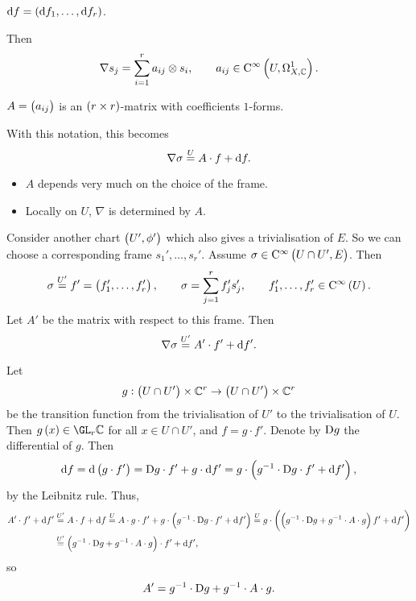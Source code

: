 \begin{notation*}
$ \d f = \br{\d f_1, \dots, \d f_r} $.
\end{notation*}

Then
$$ \nabla s_j = \sum_{i = 1}^r a_{ij} \otimes s_i, \qquad a_{ij} \in \C^\infty\br{U, \Omega_{X, \CC}^1}. $$

\begin{notation*}
$ A = \br{a_{ij}} $ is an $ \br{r \times r} $-matrix with coefficients $ 1 $-forms.
\end{notation*}

With this notation, this becomes
$$ \nabla\sigma \overset{U}{=} A \cdot f + \mathrm{d} f. $$
\begin{itemize}
\item $ A $ depends very much on the choice of the frame.
\item Locally on $ U $, $ \nabla $ is determined by $ A $.
\end{itemize}
Consider another chart $ \br{U', \phi'} $ which also gives a trivialisation of $ E $. So we can choose a corresponding frame $ s_1', \dots, s_r' $. Assume $ \sigma \in \C^\infty\br{U \cap U', E} $. Then
$$ \sigma \overset{U'}{=} f' = \br{f_1', \dots, f_r'}, \qquad \sigma = \sum_{j = 1}^r f_j's_j', \qquad f_1', \dots, f_r' \in \C^\infty\br{U}. $$
Let $ A' $ be the matrix with respect to this frame. Then
$$ \nabla\sigma \overset{U'}{=} A' \cdot f' + \mathrm{d} f'. $$

\pagebreak


Let
$$ g : \br{U \cap U'} \times \CC^r \to \br{U \cap U'} \times \CC^r $$
be the transition function from the trivialisation of $ U' $ to the trivialisation of $ U $. Then $ g\br{x} \in \GL_r \CC $ for all $ x \in U \cap U' $, and $ f = g \cdot f' $. Denote by $ \mathrm{D} g $ the differential of $ g $. Then
$$ \d f = \d\br{g \cdot f'} = \D g \cdot f' + g \cdot \d f' = g \cdot \br{g^{-1} \cdot \D g \cdot f' + \d f'}, $$
by the Leibnitz rule. Thus,
\begin{align*}
A' \cdot f' + \d f'
& \overset{U'}{=} A \cdot f + \d f
\overset{U}{=} A \cdot g \cdot f' + g \cdot \br{g^{-1} \cdot \D g \cdot f' + \d f'}
\overset{U}{=} g \cdot \br{\br{g^{-1} \cdot \D g + g^{-1} \cdot A \cdot g}f' + \d f'} \\
& \overset{U'}{=} \br{g^{-1} \cdot \D g + g^{-1} \cdot A \cdot g} \cdot f' + \d f',
\end{align*}
so
$$ A' = g^{-1} \cdot \mathrm{D} g + g^{-1} \cdot A \cdot g. $$

